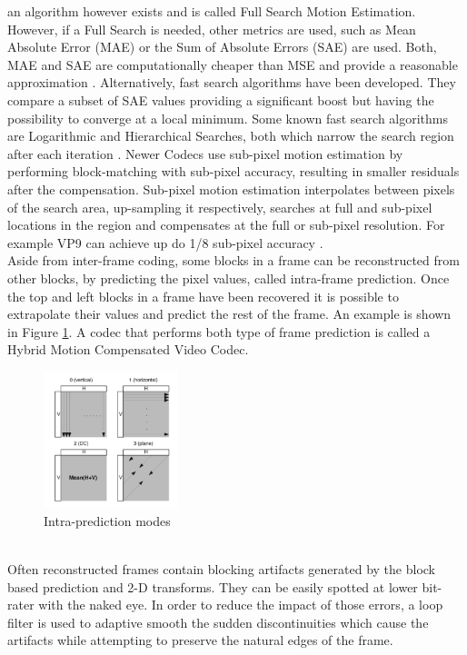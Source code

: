 \documentclass[a4paper,11pt,oneside]{article}
\begin{document}
an algorithm however exists and is called Full Search Motion Estimation. However, if a Full Search is needed, other metrics are used, such as Mean Absolute Error
(MAE) or the Sum of Absolute Errors (SAE) are used. Both, MAE and SAE are computationally cheaper than MSE and provide a reasonable
approximation \cite[pp.~99]{richardson2002video}. Alternatively, fast search algorithms have been developed. They compare a subset of SAE values providing a significant boost but having the possibility to converge at a local minimum. Some known fast search algorithms
are Logarithmic and Hierarchical Searches, both which narrow the search region after each iteration \cite{vsp_coursera}. 
Newer Codecs use sub-pixel motion estimation by performing block-matching with sub-pixel accuracy, resulting in smaller residuals after the compensation. Sub-pixel motion estimation interpolates between pixels of the search area, up-sampling it respectively, searches at full and sub-pixel locations in the region and compensates at the full or sub-pixel resolution. For example VP9 can achieve up do 1/8 sub-pixel accuracy \cite[pp.~29]{vp9_bitstream}. \\
\indent Aside from inter-frame coding, some blocks in a frame can be reconstructed from other blocks, by predicting the pixel values, called intra-frame prediction. Once the top and left blocks in a frame have been recovered it is possible to extrapolate their values and predict the rest of the frame. An example is shown in Figure \ref{figure:intra-coding}. A codec that performs both type of frame prediction is called a Hybrid Motion Compensated Video Codec. 
\begin{figure}[h]
    \centering
    \includegraphics[width=0.35\textwidth]{../figures/intra-coding.pdf}
    \caption{Intra-prediction modes \cite[pp.381]{intra_codec_papaer}}
    \label{figure:intra-coding}
\end{figure} \\
\indent Often reconstructed frames contain blocking artifacts generated by the block based prediction and 2-D transforms. They can be easily spotted at lower bit-rater with the naked eye. In order to reduce the impact of those errors, a loop filter is used to adaptive smooth the sudden discontinuities which cause the artifacts while attempting to preserve the natural edges of the frame.\\ 
\end{document}
